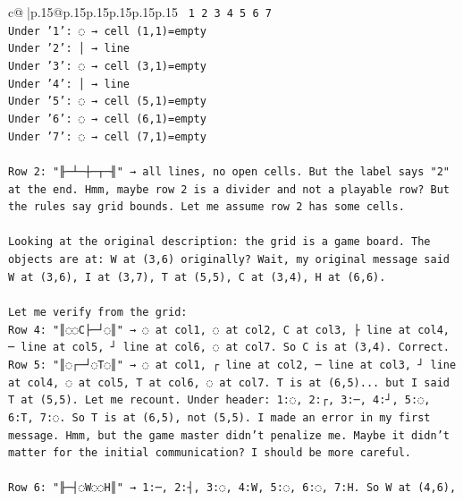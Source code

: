\documentclass{article}
\begin{document}
{\begin{supertabular}{c@{$\;$}|p{.15\linewidth}@{}p{.15\linewidth}p{.15\linewidth}p{.15\linewidth}p{.15\linewidth}p{.15\linewidth}}
{{{\texttt{  1 2 3 4 5 6 7} \\
\texttt{Under '1': ◌ → cell (1,1)=empty} \\
\texttt{Under '2': │ → line} \\
\texttt{Under '3': ◌ → cell (3,1)=empty} \\
\texttt{Under '4': │ → line} \\
\texttt{Under '5': ◌ → cell (5,1)=empty} \\
\texttt{Under '6': ◌ → cell (6,1)=empty} \\
\texttt{Under '7': ◌ → cell (7,1)=empty} \\
\\ 
\texttt{Row 2: "╟─┴─┼─┬─╢" → all lines, no open cells. But the label says "2" at the end. Hmm, maybe row 2 is a divider and not a playable row? But the rules say grid bounds. Let me assume row 2 has some cells.} \\
\\ 
\texttt{Looking at the original description: the grid is a game board. The objects are at: W at (3,6) originally? Wait, my original message said W at (3,6), I at (3,7), T at (5,5), C at (3,4), H at (6,6).} \\
\\ 
\texttt{Let me verify from the grid:} \\
\texttt{Row 4: "║◌◌C├─┘◌║" → ◌ at col1, ◌ at col2, C at col3, ├ line at col4, ─ line at col5, ┘ line at col6, ◌ at col7. So C is at (3,4). Correct.} \\
\texttt{Row 5: "║◌┌─┘◌T◌║" → ◌ at col1, ┌ line at col2, ─ line at col3, ┘ line at col4, ◌ at col5, T at col6, ◌ at col7. T is at (6,5)... but I said T at (5,5). Let me recount. Under header: 1:◌, 2:┌, 3:─, 4:┘, 5:◌, 6:T, 7:◌. So T is at (6,5), not (5,5). I made an error in my first message. Hmm, but the game master didn't penalize me. Maybe it didn't matter for the initial communication? I should be more careful.} \\
\\ 
\texttt{Row 6: "╟─┤◌W◌◌H║" → 1:─, 2:┤, 3:◌, 4:W, 5:◌, 6:◌, 7:H. So W at (4,6),} \\
            }
        }
    }
     \\ \\


\end{supertabular}}
\end{document}
